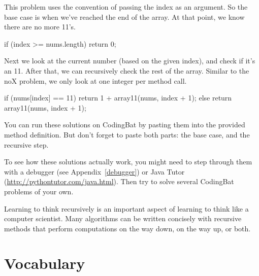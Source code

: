 This problem uses the convention of passing the index as an argument.
So the base case is when we've reached the end of the array.
At that point, we know there are no more 11's.

\begin{code}
if (index >= nums.length) {
    return 0;
}
\end{code}

Next we look at the current number (based on the given index), and check if it's  an 11.
After that, we can recursively check the rest of the array.
Similar to the noX problem, we only look at one integer per method call.

\begin{code}
if (nums[index] == 11) {
    return 1 + array11(nums, index + 1);
} else {
    return array11(nums, index + 1);
}
\end{code}

You can run these solutions on CodingBat by pasting them into the provided method definition.
But don't forget to paste both parts: the base case, and the recursive step.


To see how these solutions actually work, you might need to step through them with a debugger (see Appendix~\ref{debugger}) or Java Tutor (\url{http://pythontutor.com/java.html}).
Then try to solve several CodingBat problems of your own.

Learning to think recursively is an important aspect of learning to think like a computer scientist.
Many algorithms can be written concisely with recursive methods that perform computations on the way down, on the way up, or both.


\section{Vocabulary}

